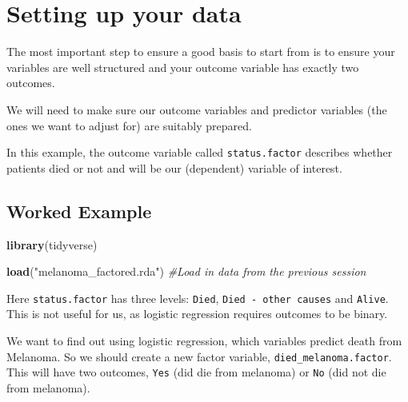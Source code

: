 \documentclass[]{book}
\makeatletter
\newenvironment{Shaded}{\begin{snugshade}}{\end{snugshade}}
\newcommand{\KeywordTok}[1]{\textcolor[rgb]{0.13,0.29,0.53}{\textbf{#1}}}
\newcommand{\StringTok}[1]{\textcolor[rgb]{0.31,0.60,0.02}{#1}}
\newcommand{\CommentTok}[1]{\textcolor[rgb]{0.56,0.35,0.01}{\textit{#1}}}
\newcommand{\OperatorTok}[1]{\textcolor[rgb]{0.81,0.36,0.00}{\textbf{#1}}}
\newcommand{\NormalTok}[1]{#1}
\newenvironment{kframe}{%
\medskip{}
\setlength{\fboxsep}{.8em}
 \def\at@end@of@kframe{}%
 \ifinner\ifhmode%
  \def\at@end@of@kframe{\end{minipage}}%
  \begin{minipage}{\columnwidth}%
 \fi\fi%
 \def\FrameCommand##1{\hskip\@totalleftmargin \hskip-\fboxsep
 \colorbox{shadecolor}{##1}\hskip-\fboxsep
     \hskip-\linewidth \hskip-\@totalleftmargin \hskip\columnwidth}%
 \MakeFramed {\advance\hsize-\width
   \@totalleftmargin\z@ \linewidth\hsize
   \@setminipage}}%
 {\par\unskip\endMakeFramed%
 \at@end@of@kframe}
\renewenvironment{Shaded}{\begin{kframe}}{\end{kframe}}
\makeatother
\begin{document}
\section{Setting up your data}\label{setting-up-your-data}

The most important step to ensure a good basis to start from is to
ensure your variables are well structured and your outcome variable has
exactly two outcomes.

We will need to make sure our outcome variables and predictor variables
(the ones we want to adjust for) are suitably prepared.

In this example, the outcome variable called \texttt{status.factor}
describes whether patients died or not and will be our (dependent)
variable of interest.

\subsection{Worked Example}\label{worked-example}

\begin{Shaded}
\begin{Highlighting}[]
\KeywordTok{library}\NormalTok{(tidyverse)}

\KeywordTok{load}\NormalTok{(}\StringTok{"melanoma_factored.rda"}\NormalTok{)}
\CommentTok{#Load in data from the previous session}
\end{Highlighting}
\end{Shaded}

Here \texttt{status.factor} has three levels: \texttt{Died},
\texttt{Died\ -\ other\ causes} and \texttt{Alive}. This is not useful
for us, as logistic regression requires outcomes to be binary.

We want to find out using logistic regression, which variables predict
death from Melanoma. So we should create a new factor variable,
\texttt{died\_melanoma.factor}. This will have two outcomes,
\texttt{Yes} (did die from melanoma) or \texttt{No} (did not die from
melanoma).

\begin{Shaded}
\end{Shaded}
\end{document}
